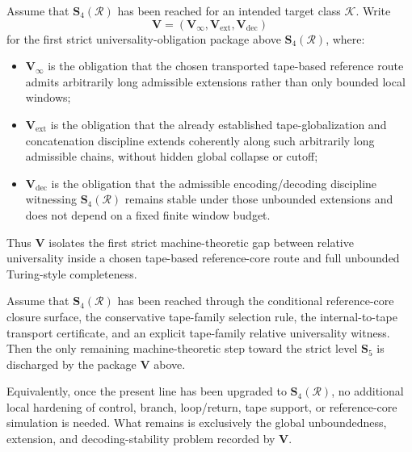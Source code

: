 \begin{definition}
Assume that \(\mathbf S_4(\mathcal R)\) has been reached for an intended target class \(\mathcal K\). Write
\[
\mathbf V=(\mathbf V_\infty,\mathbf V_{\mathrm{ext}},\mathbf V_{\mathrm{dec}})
\]
for the first strict universality-obligation package above \(\mathbf S_4(\mathcal R)\), where:
\begin{itemize}[leftmargin=2em]
  \item \(\mathbf V_\infty\) is the obligation that the chosen transported tape-based reference route admits arbitrarily long admissible extensions rather than only bounded local windows;
  \item \(\mathbf V_{\mathrm{ext}}\) is the obligation that the already established tape-globalization and concatenation discipline extends coherently along such arbitrarily long admissible chains, without hidden global collapse or cutoff;
  \item \(\mathbf V_{\mathrm{dec}}\) is the obligation that the admissible encoding/decoding discipline witnessing \(\mathbf S_4(\mathcal R)\) remains stable under those unbounded extensions and does not depend on a fixed finite window budget.
\end{itemize}
Thus \(\mathbf V\) isolates the first strict machine-theoretic gap between relative universality inside a chosen tape-based reference-core route and full unbounded Turing-style completeness.
\end{definition}

\begin{proposition}
Assume that \(\mathbf S_4(\mathcal R)\) has been reached through the conditional reference-core closure surface, the conservative tape-family selection rule, the internal-to-tape transport certificate, and an explicit tape-family relative universality witness. Then the only remaining machine-theoretic step toward the strict level \(\mathbf S_5\) is discharged by the package \(\mathbf V\) above.

Equivalently, once the present line has been upgraded to \(\mathbf S_4(\mathcal R)\), no additional local hardening of control, branch, loop/return, tape support, or reference-core simulation is needed. What remains is exclusively the global unboundedness, extension, and decoding-stability problem recorded by \(\mathbf V\).
\end{proposition}

